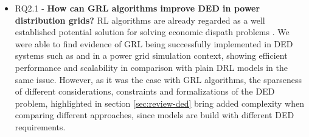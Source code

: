 \begin{itemize}
\begin{itemize}
		\item RQ2.1 - \textbf{How can \ac{GRL} algorithms improve \acf{DED} in power distribution grids?}  \ac{RL} algorithms are already regarded as a well established potential solution for solving economic dispath problems \cite{pereraApplicationsReinforcementLearning2021}. We were able to find evidence of \ac{GRL} being successfully implemented in \ac{DED} systems such as \cite{chenScalableGraphReinforcement2023} and \cite{liNovelGraphReinforcement2022} in a power grid simulation context, showing efficient performance and scalability in comparison with plain \ac{DRL} models in the same issue. However, as it was the case with \ac{GRL} algorithms, the sparseness of different considerations, constraints and formalizations of the \ac{DED} problem, highlighted in section \ref{sec:review-ded} bring added complexity when comparing different approaches, since models are build with different \ac{DED} requirements. 
	\end{itemize}
\end{itemize}





